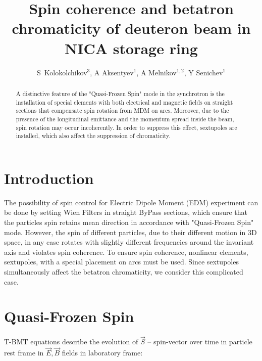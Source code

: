 \documentclass[a4paper]{jpconf}
\begin{document}
\title{Spin coherence and betatron chromaticity of deuteron beam in NICA storage ring}

\author{S~Kolokolchikov$^3$, A Aksentyev$^1$, A Melnikov$^{1,2}$, Y Senichev$^1$}

\address{$^1$Institute for Nuclear Research of the Russian Academy of Sciences, Moscow, Russia,\\
	$^2$Landau Institute of Theoretical Physics, Chernogolovka, Russia,\\
	$^3$International Union of Pure and Applied Physics, Switzerland}


\begin{abstract}
A distinctive feature of the "Quasi-Frozen Spin" mode in the synchrotron is the installation of special elements with both electrical and magnetic fields on straight sections that compensate spin rotation from MDM on arcs. Moreover, due to the presence of the longitudinal emittance and the momentum spread inside the beam, spin rotation may occur incoherently. In order to suppress this effect, sextupoles are installed, which also affect the suppression of chromaticity.
\end{abstract}

\section{Introduction}

The possibility of spin control for Electric Dipole Moment (EDM) experiment can be done by setting Wien Filters in straight ByPass sections, which ensure that the particles spin retains mean direction in accordance with "Quasi-Frozen Spin" mode.
However, the spin of different particles, due to their different motion in 3D space, in any case rotates with
slightly different frequencies around the invariant axis and violates spin coherence. To ensure spin
coherence, nonlinear elements, sextupoles, with a special placement on arcs must be used. Since sextupoles
simultaneously affect the betatron chromaticity, we consider this complicated case.

\section{Quasi-Frozen Spin}

\par T-BMT equations describe the evolution of $\vec{S}$ -- spin-vector over time in particle rest frame in $\vec{E}, \vec{B}$ fields in laboratory frame\cite{FS}:
\end{document}
